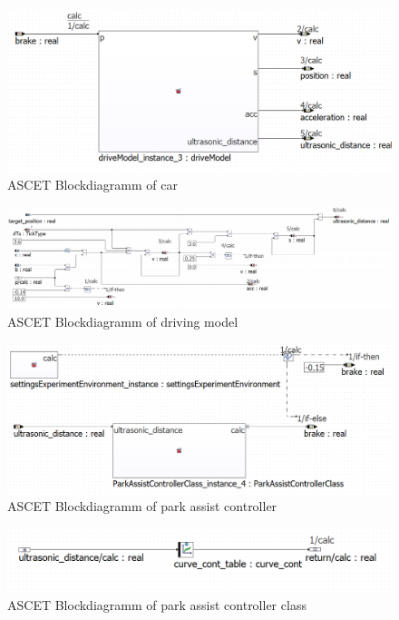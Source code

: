 \begin{figure}[H]
\centering
\includegraphics[width=1\textwidth]{images/Blockdiagramm_car.png}
\caption{ASCET Blockdiagramm of car}
\label{fig:BlockdiagrammCar}
\end{figure}

\begin{figure}[H]
\centering
\includegraphics[width=1\textwidth]{images/Blockdiagramm_drivingmodel.png}
\caption{ASCET Blockdiagramm of driving model}
\label{fig:BlockdiagrammDrivingModel}
\end{figure}

\begin{figure}[H]
\centering
\includegraphics[width=1\textwidth]{images/Blockdiagramm_ParkAssistController.png}
\caption{ASCET Blockdiagramm of park assist controller}
\label{fig:BlockdiagrammParkAssistController}
\end{figure}

\begin{figure}[H]
\centering
\includegraphics[width=1\textwidth]{images/Blockdiagramm_ParkAssistControllerClass.png}
\caption{ASCET Blockdiagramm of park assist controller class}
\label{fig:BlockdiagrammParkAssistControllerClass}
\end{figure}

